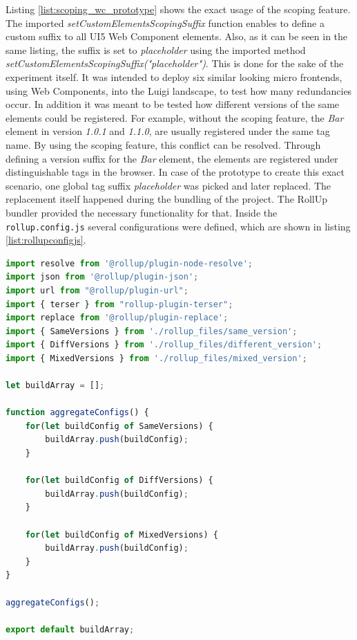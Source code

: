 Listing \ref{list:scoping_wc_prototype} shows the exact usage of the scoping feature. 
The imported \textit{setCustomElementsScopingSuffix} function enables to define a custom suffix to all UI5 Web Component elements. Also, as it can be seen in the same listing, the suffix is set to \textit{placeholder} using the imported method \textit{setCustomElementsScopingSuffix("placeholder")}.
This is done for the sake of the experiment itself. It was intended to deploy six similar looking micro frontends, using Web Components, into the Luigi landscape, to test how many redundancies occur. In addition it was meant to be tested how different versions of the same elements could be registered. For example, without the scoping feature, the \textit{Bar} element in version \textit{1.0.1} and \textit{1.1.0}, are usually registered under the same tag name. By using the scoping feature, this conflict can be resolved.
Through defining a version suffix for the \textit{Bar} element, the elements are registered under distinguishable tags in the browser.
In case of the prototype to create this exact scenario, one global tag suffix \textit{placeholder} was picked and later replaced. The replacement itself happened during the bundling of the project. The RollUp bundler provided the necessary functionality for that.
Inside the \texttt{rollup.config.js} several configurations were defined, which are shown in listing \ref{list:rollupconfigjs}.
	
\begin{lstlisting}[language=JavaScript, caption=Content of the \texttt{rollup.config.js}, label=list:rollupconfigjs,  xleftmargin=.0\textwidth, xrightmargin=.0\textwidth]
import resolve from '@rollup/plugin-node-resolve';
import json from '@rollup/plugin-json';
import url from "@rollup/plugin-url";
import { terser } from "rollup-plugin-terser";
import replace from '@rollup/plugin-replace';
import { SameVersions } from './rollup_files/same_version';
import { DiffVersions } from './rollup_files/different_version';
import { MixedVersions } from './rollup_files/mixed_version';

let buildArray = [];

function aggregateConfigs() {
	for(let buildConfig of SameVersions) {
		buildArray.push(buildConfig);
	}
	
	for(let buildConfig of DiffVersions) {
		buildArray.push(buildConfig);
	}
	
	for(let buildConfig of MixedVersions) {
		buildArray.push(buildConfig);
	}
}
	
aggregateConfigs();

export default buildArray;
\end{lstlisting}
	
